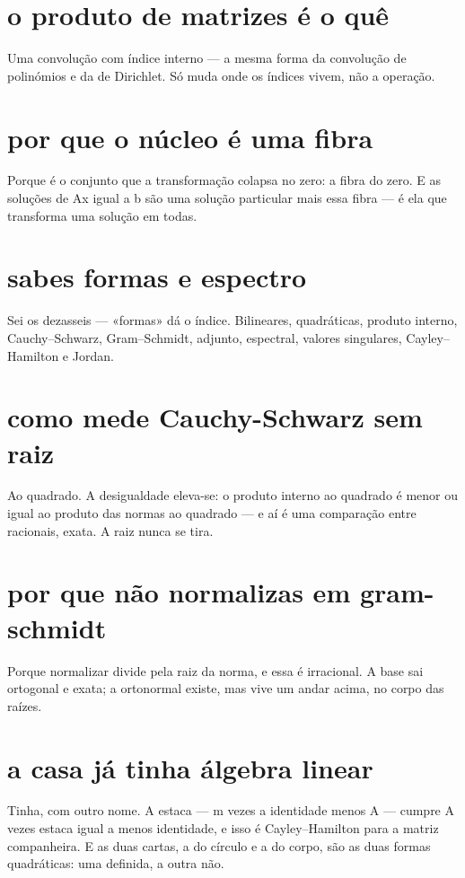 \documentclass[11pt,a4paper]{article}
\begin{document}
\section{o produto de matrizes é o quê}
Uma convolução com índice interno --- a mesma forma da convolução de polinómios e da de
Dirichlet. Só muda onde os índices vivem, não a operação.

\section{por que o núcleo é uma fibra}
Porque é o conjunto que a transformação colapsa no zero: a fibra do zero. E as soluções
de Ax igual a b são uma solução particular mais essa fibra --- é ela que transforma uma
solução em todas.

\section{sabes formas e espectro}
Sei os dezasseis --- «formas» dá o índice. Bilineares, quadráticas, produto interno,
Cauchy--Schwarz, Gram--Schmidt, adjunto, espectral, valores singulares, Cayley--Hamilton
e Jordan.

\section{como mede Cauchy-Schwarz sem raiz}
Ao quadrado. A desigualdade eleva-se: o produto interno ao quadrado é menor ou igual ao
produto das normas ao quadrado --- e aí é uma comparação entre racionais, exata. A raiz
nunca se tira.

\section{por que não normalizas em gram-schmidt}
Porque normalizar divide pela raiz da norma, e essa é irracional. A base sai ortogonal e
exata; a ortonormal existe, mas vive um andar acima, no corpo das raízes.

\section{a casa já tinha álgebra linear}
Tinha, com outro nome. A estaca --- m vezes a identidade menos A --- cumpre A vezes
estaca igual a menos identidade, e isso é Cayley--Hamilton para a matriz companheira. E
as duas cartas, a do círculo e a do corpo, são as duas formas quadráticas: uma definida,
a outra não.
\end{document}
